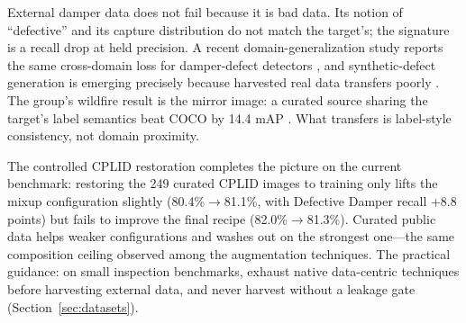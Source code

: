 \documentclass[conference]{IEEEtran}
\newcommand{\dd}{Defective Damper}
\begin{document}
External damper data does not fail because it is bad data. Its notion of ``defective'' and its capture distribution do not match the target's; the signature is a recall drop at held precision. A recent domain-generalization study reports the same cross-domain loss for damper-defect detectors \cite{yang2025oneforall}, and synthetic-defect generation is emerging precisely because harvested real data transfers poorly \cite{stefenon2026diffusion}. The group's wildfire result is the mirror image: a curated source sharing the target's label semantics beat COCO by 14.4 mAP \cite{vazquez2024wildfire,vazquez2026wildfire}. What transfers is label-style consistency, not domain proximity.

The controlled CPLID restoration completes the picture on the current benchmark: restoring the 249 curated CPLID images to training only lifts the mixup configuration slightly (80.4\%$\to$81.1\%, with \dd{} recall $+8.8$ points) but fails to improve the final recipe (82.0\%$\to$81.3\%). Curated public data helps weaker configurations and washes out on the strongest one---the same composition ceiling observed among the augmentation techniques. The practical guidance: on small inspection benchmarks, exhaust native data-centric techniques before harvesting external data, and never harvest without a leakage gate (Section~\ref{sec:datasets}).

\end{document}

